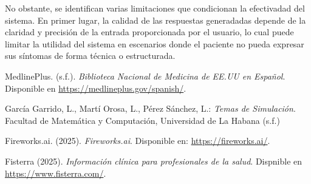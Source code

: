 \documentclass{llncs}
\begin{document}
No obstante, se identifican varias limitaciones que condicionan la efectivadad del sistema. En primer lugar, la calidad de las respuestas generadadas depende de la claridad y precisión de la entrada proporcionada por el usuario, lo cual puede limitar la utilidad del sistema en escenarios
donde el paciente no pueda expresar sus síntomas de forma técnica o estructurada.

%
%
\begin{thebibliography}{5}
%
MedlinePlus. (s.f.). \textit{Biblioteca Nacional de Medicina de EE.UU en Español}. Disponible en
\url{https://medlineplus.gov/spanish/}.

García Garrido, L., Martí Orosa, L., Pérez Sánchez, L.: \textit{Temas de Simulación}. Facultad de Matemática y Computación, Universidad de La Habana (s.f.)

Fireworks.ai. (2025). \textit{Fireworks.ai}. Disponible en: \url{https://fireworks.ai/}.

Fisterra (2025). \textit{Información clínica para profesionales de la salud}. Dispnible en \url{https://www.fisterra.com/}.

\end{thebibliography}
\end{document}
